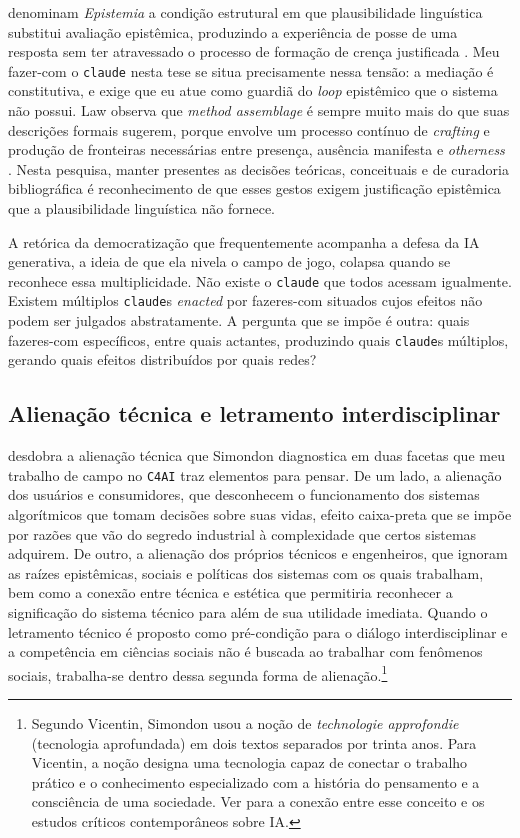 \textcite{Quattrociocchi2025Epistemological} denominam \textit{Epistemia} a condição estrutural em que plausibilidade linguística substitui avaliação epistêmica, produzindo a experiência de posse de uma resposta sem ter atravessado o processo de formação de crença justificada \parencite[p.~8]{Quattrociocchi2025Epistemological}. Meu fazer-com o \texttt{claude} nesta tese se situa precisamente nessa tensão: a mediação é constitutiva, e exige que eu atue como guardiã do \textit{loop} epistêmico que o sistema não possui. Law observa que \textit{method assemblage} é sempre muito mais do que suas descrições formais sugerem, porque envolve um processo contínuo de \textit{crafting} e produção de fronteiras necessárias entre presença, ausência manifesta e \textit{otherness} \parencite[p.~144]{Law2004After}. Nesta pesquisa, manter presentes as decisões teóricas, conceituais e de curadoria bibliográfica é reconhecimento de que esses gestos exigem justificação epistêmica que a plausibilidade linguística não fornece.

A retórica da democratização que frequentemente acompanha a defesa da IA generativa, a ideia de que ela nivela o campo de jogo, colapsa quando se reconhece essa multiplicidade. Não existe o \texttt{claude} que todos acessam igualmente. Existem múltiplos \texttt{claude}s \textit{enacted} por fazeres-com situados cujos efeitos não podem ser julgados abstratamente. A pergunta que se impõe é outra: quais fazeres-com específicos, entre quais actantes, produzindo quais \texttt{claude}s múltiplos, gerando quais efeitos distribuídos por quais redes?

\subsection{Alienação técnica e letramento interdisciplinar}

\textcite{Vicentin_2022_Esboco} desdobra a alienação técnica que Simondon diagnostica em duas facetas que meu trabalho de campo no \texttt{C4AI} traz elementos para pensar. De um lado, a alienação dos usuários e consumidores, que desconhecem o funcionamento dos sistemas algorítmicos que tomam decisões sobre suas vidas, efeito caixa-preta que se impõe por razões que vão do segredo industrial à complexidade que certos sistemas adquirem. De outro, a alienação dos próprios técnicos e engenheiros, que ignoram as raízes epistêmicas, sociais e políticas dos sistemas com os quais trabalham, bem como a conexão entre técnica e estética que permitiria reconhecer a significação do sistema técnico para além de sua utilidade imediata. Quando o letramento técnico é proposto como pré-condição para o diálogo interdisciplinar e a competência em ciências sociais não é buscada ao trabalhar com fenômenos sociais, trabalha-se dentro dessa segunda forma de alienação.\footnote{Segundo Vicentin, Simondon usou a noção de \textit{technologie approfondie} (tecnologia aprofundada) em dois textos separados por trinta anos. Para Vicentin, a noção designa uma tecnologia capaz de conectar o trabalho prático e o conhecimento especializado com a história do pensamento e a consciência de uma sociedade. Ver \textcite{Vicentin_2022_Esboco} para a conexão entre esse conceito e os estudos críticos contemporâneos sobre IA.}

